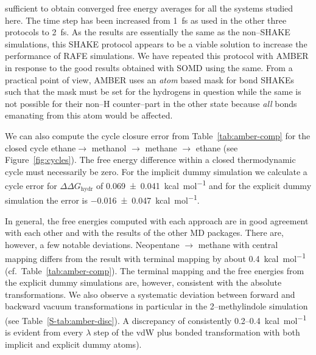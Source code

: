 \documentclass[journal=jctcce,manuscript=article]{achemso}
\begin{document}
sufficient to obtain converged free energy averages for all the systems studied 
here.  The time step has been increased from \SI{1}{fs} as used in the other 
three protocols to \SI{2}{fs}.  As the results are essentially the same as the 
non--SHAKE simulations, this SHAKE protocol appears to be a viable solution to 
increase the performance of RAFE simulations.  We have repeated this protocol 
with AMBER in response to the good results obtained with SOMD using the same.  
From a practical point of view, 
AMBER uses an \emph{atom} based mask for bond SHAKEs such that the mask must be 
set for the hydrogens in question while the same is not possible for their 
non--H counter--part in the other state because \emph{all} bonds emanating from 
this atom would be affected.

We can also compute the cycle closure error from Table~\ref{tab:amber-comp} for 
the closed cycle ethane$ \rightarrow$ methanol $\rightarrow$ methane 
$\rightarrow$ ethane (see Figure~\ref{fig:cycles}).  The free energy difference 
within a closed thermodynamic cycle must necessarily be zero.
For the implicit dummy simulation we calculate a cycle error for $\Delta\Delta 
G_\mathrm{hydr}$ of \SI{0.069+-0.041}{kcal.mol^{-1}} and for the explicit dummy 
simulation the error is \SI{-0.016+-0.047}{kcal.mol^{-1}}.

In general, the free energies computed with each approach are in good agreement 
with each other and with the results of the other MD packages.  There are, 
however, a few notable deviations.  Neopentane $\rightarrow$ methane with 
central mapping differs from the result with terminal mapping by about 
\SI{0.4}{kcal.mol^{-1}} (cf.\ Table~\ref{tab:amber-comp}).
The terminal mapping and the free energies from the explicit dummy simulations 
are, however, consistent with the absolute transformations.  We also observe a 
systematic deviation between forward and backward vacuum transformations in 
particular in the 2--methylindole simulation (see Table~\ref{S-tab:amber-disc}).
A discrepancy of consistently 0.2--\SI{0.4}{kcal.mol^{-1}} is evident from 
every $\lambda$ step of the vdW plus bonded transformation with both implicit 
and explicit dummy atoms).
\end{document}
